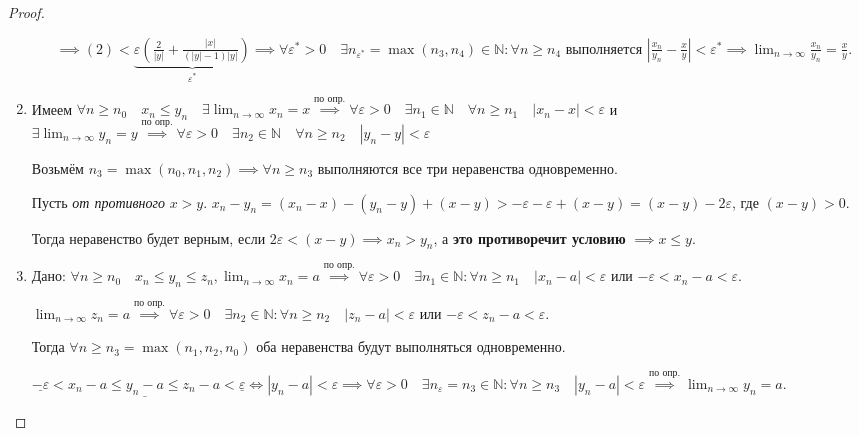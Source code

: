 \documentclass[a4paper,oneside]{article}
\newcommand{\bydef}{\stackrel{\text{по опр.}}{\implies}} %
\newcommand{\dslim}{\displaystyle\lim}
\newcommand{\dslimn}{\dslim_{n \to \infty}}
\theoremstyle{definition}
\theoremstyle{definition}
\theoremstyle{definition}
\begin{document}
\begin{proof}
\begin{enumerate}
\begin{enumerate}[label*=\arabic*.]
                    $\implies (2) < \underbrace{\varepsilon ( \frac{2}{|y|} + \frac{|x|}{ (|y| - 1) |y| } )}_{\varepsilon^*}
                    \implies \forall \varepsilon^* > 0 \quad 
                    \exists n_{\varepsilon^*} = \max (n_3, n_4) \in \mathbb{N}:
                    \forall n \ge n_4$ выполняется 
                    $\left| \frac{x_n}{y_n} - \frac{x}{y} \right| < \varepsilon^* 
                    \implies \dslimn \frac{x_n}{y_n} = \frac{x}{y}$.
            \end{enumerate}
    
        \item 
            Имеем $\forall n \ge n_0 \quad x_n \le y_n \quad 
            \exists \dslimn x_n = x 
            \bydef \forall \varepsilon > 0 \quad
            \exists n_1 \in \mathbb{N} \quad \forall n \ge n_1 \quad |x_n - x| < \varepsilon$
            и $\exists \dslimn y_n = y 
            \bydef \forall \varepsilon > 0 \quad
            \exists n_2 \in \mathbb{N} \quad \forall n \ge n_2 \quad |y_n - y| < \varepsilon$
        
            Возьмём $n_3 = \max (n_0, n_1, n_2) \implies \forall n \ge n_3$ выполняются
            все три неравенства одновременно.
        
            Пусть \textit{от противного} $x > y$. 
            $x_n - y_n = (x_n - x) - (y_n - y) + (x - y) > 
            -\varepsilon - \varepsilon + (x - y) = (x - y) - 2 \varepsilon$, где $(x - y) > 0$.
        
            Тогда неравенство будет верным, если $2 \varepsilon < (x - y) \implies x_n > y_n$,
            а \textbf{это противоречит условию} $\implies x \le y$.
    
        \item 
            Дано: $\forall n \ge n_0 \quad x_n \le y_n \le z_n, 
            \dslimn x_n = a \bydef
            \forall \varepsilon > 0 \quad \exists n_1 \in \mathbb{N}:
            \forall n \ge n_1 \quad |x_n - a| < \varepsilon$ или
            $-\varepsilon < x_n - a < \varepsilon$.
            
            $\dslimn z_n = a \bydef
            \forall \varepsilon > 0 \quad \exists n_2 \in \mathbb{N}:
            \forall n \ge n_2 \quad |z_n - a| < \varepsilon$ или
            $-\varepsilon < z_n - a < \varepsilon$.
        
            Тогда $\forall n \ge n_3 = \max (n_1, n_2, n_0)$ оба неравенства
            будут выполняться одновременно.
        
            $\underline{-\varepsilon} < x_n - a \le \underline{y_n - a} \le
            z_n - a < \underline{\varepsilon} \Leftrightarrow |y_n - a| < \varepsilon
            \implies \forall \varepsilon > 0 \quad \exists n_\varepsilon = n_3 \in \mathbb{N}:
            \forall n \ge n_3 \quad |y_n - a| < \varepsilon \bydef 
            \dslimn y_n = a$.
    \end{enumerate}
\end{proof}
\end{document}

